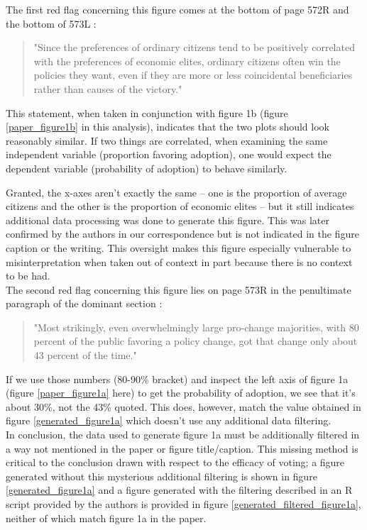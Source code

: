 \documentclass[]{article}
\begin{document}
The first red flag concerning this figure comes at the bottom of page 572R and the bottom of 573L \cite{gilens}:
\begin{quotation}
	"Since the preferences of ordinary citizens tend to be positively correlated with the preferences of economic elites, ordinary citizens often win the policies they want, even if they are more or less coincidental beneficiaries rather than causes of the victory."
\end{quotation}
This statement, when taken in conjunction with figure 1b (figure \ref{paper_figure1b} in this analysis), indicates that the two plots should look reasonably similar.
If two things are correlated, when examining the same independent variable (proportion favoring adoption), one would expect the dependent variable (probability of adoption) to behave similarly.

Granted, the x-axes aren't exactly the same -- one is the proportion of average citizens and the other is the proportion of economic elites -- but it still indicates additional data processing was done to generate this figure. This was later confirmed by the authors in our correspondence but is not indicated in the figure caption or the writing.
This oversight makes this figure especially vulnerable to misinterpretation when taken out of context in part because there is no context to be had.\\

The second red flag concerning this figure lies on page 573R in the penultimate paragraph of the dominant section \cite{gilens}:
\begin{quotation}
	\label{43_percent}
	"Most strikingly, even overwhelmingly large pro-change majorities, with 80 percent of the public favoring a policy change, got that change only about 43 percent of the time."
\end{quotation}
If we use those numbers (80-90\% bracket) and inspect the left axis of figure 1a (figure \ref{paper_figure1a} here) to get the probability of adoption, we see that it's about 30\%, not the 43\% quoted.
This does, however, match the value obtained in figure \ref{generated_figure1a} which doesn't use any additional data filtering.\\

In conclusion, the data used to generate figure 1a must be additionally filtered in a way not mentioned in the paper or figure title/caption. 
This missing method is critical to the conclusion drawn with respect to the efficacy of voting; a figure generated without this mysterious additional filtering is shown in figure \ref{generated_figure1a} and a figure generated with the filtering described in an R script provided by the authors is provided in figure \ref{generated_filtered_figure1a}, neither of which match figure 1a in the paper.
\end{document}
